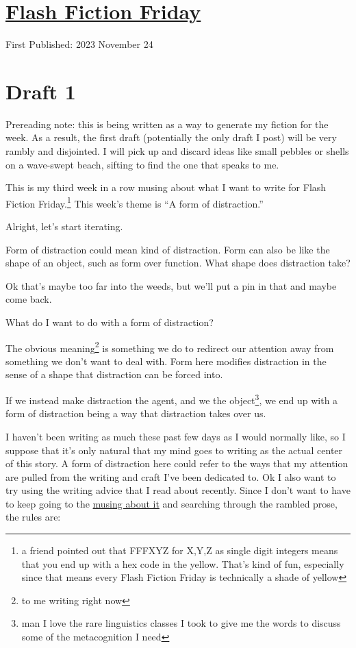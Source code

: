 \documentclass[12pt]{article}[titlepage]
\newcommand{\say}[1]{``#1''}
\newcommand{\1}{\={a}}
\newcommand{\2}{\={e}}
\newcommand{\3}{\={\i}}
\newcommand{\4}{\=o}
\newcommand{\5}{\=u}
\newcommand{\6}{\={A}}
\renewcommand{\,}{\textsuperscript{,}}
\begin{document}
\doublespacing
\section{\href{flash-fiction-228.html}{Flash Fiction Friday}}
First Published: 2023 November 24

\section{Draft 1}
Prereading note: this is being written as a way to generate my fiction for the week.
As a result, the first draft (potentially the only draft I post) will be very rambly and disjointed.
I will pick up and discard ideas like small pebbles or shells on a wave-swept beach, sifting to find the one that speaks to me.

This is my third week in a row musing about what I want to write for Flash Fiction Friday.\footnote{a friend pointed out that FFFXYZ for X,Y,Z as single digit integers means that you end up with a hex code in the yellow.
That's kind of fun, especially since that means every Flash Fiction Friday is technically a shade of yellow}
This week's theme is \say{A form of distraction.}

Alright, let's start iterating.

Form of distraction could mean kind of distraction.
Form can also be like the shape of an object, such as form over function.
What shape does distraction take?

Ok that's maybe too far into the weeds, but we'll put a pin in that and maybe come back.

What do I want to do with a form of distraction?

The obvious meaning\footnote{to me writing right now} is something we do to redirect our attention away from something we don't want to deal with.
Form here modifies distraction in the sense of a shape that distraction can be forced into.

If we instead make distraction the agent, and we the object\footnote{man I love the rare linguistics classes I took to give me the words to discuss some of the metacognition I need}, we end up with a form of distraction being a way that distraction takes over us.

I haven't been writing as much these past few days as I would normally like, so I suppose that it's only natural that my mind goes to writing as the actual center of this story.
A form of distraction here could refer to the ways that my attention are pulled from the writing and craft I've been dedicated to.
Ok I also want to try using the writing advice that I read about recently.
Since I don't want to have to keep going to the \href{writing-7.html}{musing about it} and searching through the rambled prose, the rules are:
\end{document}
